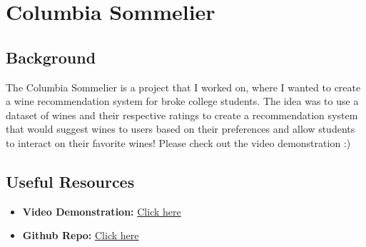 \section{Columbia Sommelier}

\subsection{Background}
The Columbia Sommelier is a project that I worked on, where I wanted to create a wine recommendation system for broke college students. The idea was to use a dataset of wines and their respective ratings to create a recommendation system that would suggest wines to users based on their preferences and allow students to interact on their favorite wines! Please check out the video demonstration :)
\subsection{Useful Resources}
\begin{itemize}
    \item \textbf{Video Demonstration:} \href{https://youtu.be/r7vNWUlK4aY}{Click here}
    \item \textbf{Github Repo:} \href{https://github.com/connorli18/columbiasommelier}{Click here}
\end{itemize}